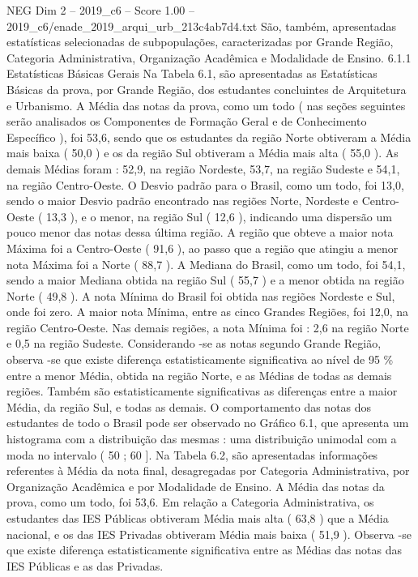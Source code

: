 \begin{textsample}{NEG Dim 2 – 2019\_c6 – Score 1.00 – 2019\_c6/enade\_2019\_arqui\_urb\_213c4ab7d4.txt}
São, também, apresentadas estatísticas selecionadas de subpopulações, caracterizadas por Grande Região, Categoria Administrativa, Organização Acadêmica e Modalidade de Ensino. 6.1.1 Estatísticas Básicas Gerais Na Tabela 6.1, são apresentadas as Estatísticas Básicas da prova, por Grande Região, dos estudantes concluintes de Arquitetura e Urbanismo.
A Média das notas da prova, como um todo ( nas seções seguintes serão analisados os Componentes de Formação Geral e de Conhecimento Específico ), foi 53,6, sendo que os estudantes da região Norte obtiveram a Média mais baixa ( 50,0 ) e os da região Sul obtiveram a Média mais alta ( 55,0 ).
As demais Médias foram : 52,9, na região Nordeste, 53,7, na região Sudeste e 54,1, na região Centro-Oeste.
O Desvio padrão para o Brasil, como um todo, foi 13,0, sendo o maior Desvio padrão encontrado nas regiões Norte, Nordeste e Centro-Oeste ( 13,3 ), e o menor, na região Sul ( 12,6 ), indicando uma dispersão um pouco menor das notas dessa última região.
A região que obteve a maior nota Máxima foi a Centro-Oeste ( 91,6 ), ao passo que a região que atingiu a menor nota Máxima foi a Norte ( 88,7 ).
A Mediana do Brasil, como um todo, foi 54,1, sendo a maior Mediana obtida na região Sul ( 55,7 ) e a menor obtida na região Norte ( 49,8 ).
A nota Mínima do Brasil foi obtida nas regiões Nordeste e Sul, onde foi zero.
A maior nota Mínima, entre as cinco Grandes Regiões, foi 12,0, na região Centro-Oeste.
Nas demais regiões, a nota Mínima foi : 2,6 na região Norte e 0,5 na região Sudeste.
Considerando -se as notas segundo Grande Região, observa -se que existe diferença estatisticamente significativa ao nível de 95 \% entre a menor Média, obtida na região Norte, e as Médias de todas as demais regiões.
Também são estatisticamente significativas as diferenças entre a maior Média, da região Sul, e todas as demais.
O comportamento das notas dos estudantes de todo o Brasil pode ser observado no Gráfico 6.1, que apresenta um histograma com a distribuição das mesmas : uma distribuição unimodal com a moda no intervalo ( 50 ; 60 ].
Na Tabela 6.2, são apresentadas informações referentes à Média da nota final, desagregadas por Categoria Administrativa, por Organização Acadêmica e por Modalidade de Ensino.
A Média das notas da prova, como um todo, foi 53,6.
Em relação a Categoria Administrativa, os estudantes das IES Públicas obtiveram Média mais alta ( 63,8 ) que a Média nacional, e os das IES Privadas obtiveram Média mais baixa ( 51,9 ).
Observa -se que existe diferença estatisticamente significativa entre as Médias das notas das IES Públicas e as das Privadas.

\end{textsample}
